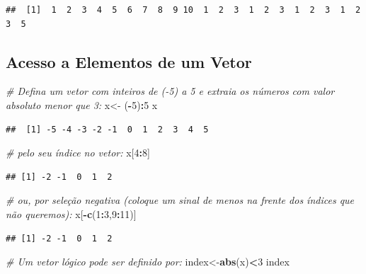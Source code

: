 \documentclass[
]{book}
\newenvironment{Shaded}{\begin{snugshade}}{\end{snugshade}}
\newcommand{\CommentTok}[1]{\textcolor[rgb]{0.56,0.35,0.01}{\textit{#1}}}
\newcommand{\DecValTok}[1]{\textcolor[rgb]{0.00,0.00,0.81}{#1}}
\newcommand{\FunctionTok}[1]{\textcolor[rgb]{0.13,0.29,0.53}{\textbf{#1}}}
\newcommand{\NormalTok}[1]{#1}
\newcommand{\OtherTok}[1]{\textcolor[rgb]{0.56,0.35,0.01}{#1}}
\newcommand{\SpecialCharTok}[1]{\textcolor[rgb]{0.81,0.36,0.00}{\textbf{#1}}}
\begin{document}
\begin{verbatim}
##  [1]  1  2  3  4  5  6  7  8  9 10  1  2  3  1  2  3  1  2  3  1  2  3  5
\end{verbatim}

\subsection{Acesso a Elementos de um Vetor}\label{acesso-a-elementos-de-um-vetor}

\begin{Shaded}
\begin{Highlighting}[]
\CommentTok{\# Defina um vetor com inteiros de ({-}5) a 5 e extraia os números com valor absoluto menor que 3:}
\NormalTok{x}\OtherTok{\textless{}{-}}\NormalTok{ (}\SpecialCharTok{{-}}\DecValTok{5}\NormalTok{)}\SpecialCharTok{:}\DecValTok{5}
\NormalTok{x}
\end{Highlighting}
\end{Shaded}

\begin{verbatim}
##  [1] -5 -4 -3 -2 -1  0  1  2  3  4  5
\end{verbatim}

\begin{Shaded}
\begin{Highlighting}[]
\CommentTok{\# pelo seu índice no vetor:}
\NormalTok{x[}\DecValTok{4}\SpecialCharTok{:}\DecValTok{8}\NormalTok{]}
\end{Highlighting}
\end{Shaded}

\begin{verbatim}
## [1] -2 -1  0  1  2
\end{verbatim}

\begin{Shaded}
\begin{Highlighting}[]
\CommentTok{\# ou, por seleção negativa (coloque um sinal de menos na frente dos índices que não queremos):}
\NormalTok{x[}\SpecialCharTok{{-}}\FunctionTok{c}\NormalTok{(}\DecValTok{1}\SpecialCharTok{:}\DecValTok{3}\NormalTok{,}\DecValTok{9}\SpecialCharTok{:}\DecValTok{11}\NormalTok{)]}
\end{Highlighting}
\end{Shaded}

\begin{verbatim}
## [1] -2 -1  0  1  2
\end{verbatim}

\begin{Shaded}
\begin{Highlighting}[]
\CommentTok{\# Um vetor lógico pode ser definido por:}
\NormalTok{index}\OtherTok{\textless{}{-}}\FunctionTok{abs}\NormalTok{(x)}\SpecialCharTok{\textless{}}\DecValTok{3}
\NormalTok{index }
\end{Highlighting}
\end{Shaded}
\end{document}
